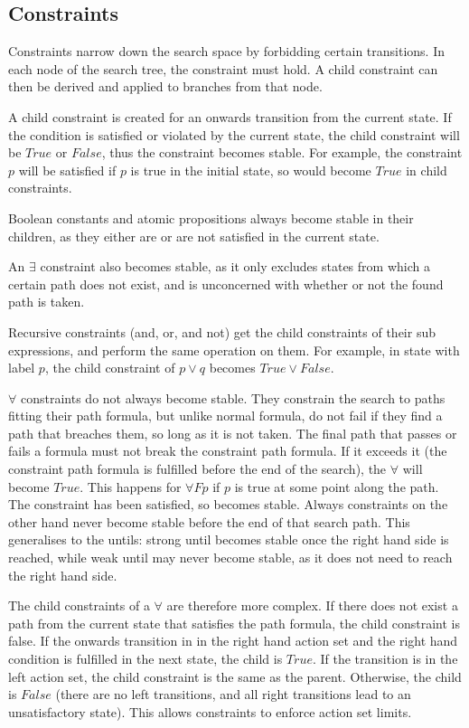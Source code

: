 \documentclass[a4paper,11pt]{article}
\begin{document}
	
	\subsection{Constraints}
	Constraints narrow down the search space by forbidding certain transitions. In each node of the search tree, the constraint must hold. A child constraint can then be derived and applied to branches from that node. 
	
	A child constraint is created for an onwards transition from the current state. If the condition is satisfied or violated by the current state, the child constraint will be $True$ or $False$, thus the constraint becomes stable. For example, the constraint $p$ will be satisfied if $p$ is true in the initial state, so would become $True$ in child constraints.
	
	Boolean constants and atomic propositions always become stable in their children, as they either are or are not satisfied in the current state.	
	
	An $\exists$ constraint also becomes stable, as it only excludes states from which a certain path does not exist, and is unconcerned with whether or not the found path is taken.
	
	Recursive constraints (and, or, and not) get the child constraints of their sub expressions, and perform the same operation on them. For example, in state with label $p$, the child constraint of $p \lor q$ becomes $True \lor False$.
	
	$\forall$ constraints do not always become stable. They constrain the search to paths fitting their path formula, but unlike normal formula, do not fail if they find a path that breaches them, so long as it is not taken. The final path that passes or fails a formula must not break the constraint path formula. If it exceeds it (the constraint path formula is fulfilled before the end of the search), the $\forall$ will become $True$. This happens for $\forall F p$ if $p$ is true at some point along the path. The constraint has been satisfied, so becomes stable. Always constraints on the other hand never become stable before the end of that search path. This generalises to the untils: strong until becomes stable once the right hand side is reached, while weak until may never become stable, as it does not need to reach the right hand side. 
	
	The child constraints of a $\forall$ are therefore more complex. If there does not exist a path from the current state that satisfies the path formula, the child constraint is false. If the onwards transition in in the right hand action set and the right hand condition is fulfilled in the next state, the child is $True$. If the transition is in the left action set, the child constraint is the same as the parent. Otherwise, the child is $False$ (there are no left transitions, and all right transitions lead to an unsatisfactory state). This allows constraints to enforce action set limits.
	
\end{document}
